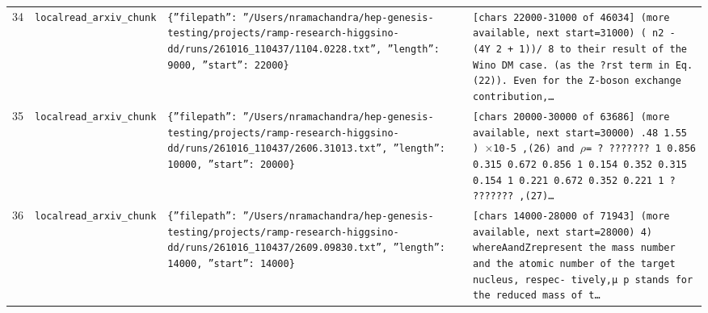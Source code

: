 \documentclass[11pt,a4paper]{article}
\begin{document}
\begin{longtable}{@{}p{}p{}p{}p{}@{}}
34 & \texttt{local}\newline\texttt{read\_\allowbreak{}arxiv\_\allowbreak{}chunk} & \texttt{\{''filepath'':\allowbreak{} ''/\allowbreak{}Users/\allowbreak{}nramachandra/\allowbreak{}hep-genesis-testing/\allowbreak{}projects/\allowbreak{}ramp-research-higgsino-dd/\allowbreak{}runs/\allowbreak{}261016\_\allowbreak{}110437/\allowbreak{}1104.0228.txt'',\allowbreak{} ''length'':\allowbreak{} 9000,\allowbreak{} ''start'':\allowbreak{} 22000\}\allowbreak{}} & \texttt{[chars 22000-31000 of 46034]\allowbreak{} (more available,\allowbreak{} next start=\allowbreak{}31000)\allowbreak{}   ( n2 - (4Y 2 + 1)\allowbreak{})\allowbreak{}/\allowbreak{} 8 to their result of the Wino DM case. (as the ?rst term in Eq. (22)\allowbreak{})\allowbreak{}. Even for the Z-boson exchange contribution,\allowbreak{}\ldots{}\allowbreak{}} \\
35 & \texttt{local}\newline\texttt{read\_\allowbreak{}arxiv\_\allowbreak{}chunk} & \texttt{\{''filepath'':\allowbreak{} ''/\allowbreak{}Users/\allowbreak{}nramachandra/\allowbreak{}hep-genesis-testing/\allowbreak{}projects/\allowbreak{}ramp-research-higgsino-dd/\allowbreak{}runs/\allowbreak{}261016\_\allowbreak{}110437/\allowbreak{}2606.31013.txt'',\allowbreak{} ''length'':\allowbreak{} 10000,\allowbreak{} ''start'':\allowbreak{} 20000\}\allowbreak{}} & \texttt{[chars 20000-30000 of 63686]\allowbreak{} (more available,\allowbreak{} next start=\allowbreak{}30000)\allowbreak{}  .48 1.55 )\allowbreak{} $\times$10-5 ,\allowbreak{}(26)\allowbreak{} and $\rho$=\allowbreak{} ? ??????? 1 0.856 0.315 0.672 0.856 1 0.154 0.352 0.315 0.154 1 0.221 0.672 0.352 0.221 1 ? ??????? ,\allowbreak{}(27)\allowbreak{}\ldots{}\allowbreak{}} \\
36 & \texttt{local}\newline\texttt{read\_\allowbreak{}arxiv\_\allowbreak{}chunk} & \texttt{\{''filepath'':\allowbreak{} ''/\allowbreak{}Users/\allowbreak{}nramachandra/\allowbreak{}hep-genesis-testing/\allowbreak{}projects/\allowbreak{}ramp-research-higgsino-dd/\allowbreak{}runs/\allowbreak{}261016\_\allowbreak{}110437/\allowbreak{}2609.09830.txt'',\allowbreak{} ''length'':\allowbreak{} 14000,\allowbreak{} ''start'':\allowbreak{} 14000\}\allowbreak{}} & \texttt{[chars 14000-28000 of 71943]\allowbreak{} (more available,\allowbreak{} next start=\allowbreak{}28000)\allowbreak{}  4)\allowbreak{} whereAandZrepresent the mass number and the atomic number of the target nucleus,\allowbreak{} respec- tively,\allowbreak{}µ p stands for the reduced mass of t\ldots{}\allowbreak{}} \\

\end{longtable}
\end{document}
